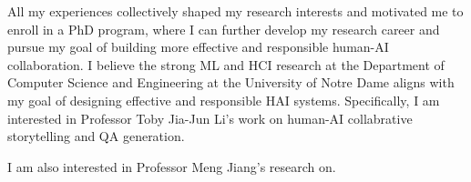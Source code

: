


All my experiences collectively shaped my research interests and motivated me to enroll in a PhD program, where I can further develop my research career and pursue my goal of building more effective and responsible human-AI collaboration. I believe the strong ML and HCI research at the Department of Computer Science and Engineering at the University of Notre Dame aligns with my goal of designing effective and responsible HAI systems. 
Specifically, I am interested in Professor Toby Jia-Jun Li's work on human-AI collabrative storytelling and QA generation.


I am also interested in Professor Meng Jiang's research on.
